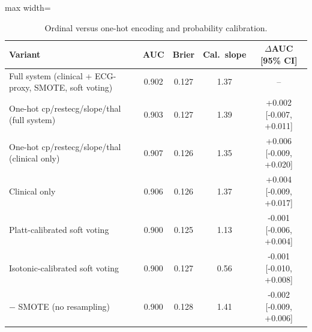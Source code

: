\begin{table}[!t]
\centering
\scriptsize
\caption{Ordinal versus one-hot encoding and probability calibration.}
\label{tab:e6}
\setlength{\tabcolsep}{3pt}
\begin{adjustbox}{max width=\linewidth}
\begin{tabular}{lcccc}
\toprule
Variant & AUC & Brier & Cal.\ slope & $\Delta$AUC [95\% CI] \\
\midrule
Full system (clinical + ECG-proxy, SMOTE, soft voting) & 0.902 & 0.127 & 1.37 & -- \\
One-hot cp/restecg/slope/thal (full system) & 0.903 & 0.127 & 1.39 & +0.002 [-0.007, +0.011] \\
One-hot cp/restecg/slope/thal (clinical only) & 0.907 & 0.126 & 1.35 & +0.006 [-0.009, +0.020] \\
Clinical only & 0.906 & 0.126 & 1.37 & +0.004 [-0.009, +0.017] \\
Platt-calibrated soft voting & 0.900 & 0.125 & 1.13 & -0.001 [-0.006, +0.004] \\
Isotonic-calibrated soft voting & 0.900 & 0.127 & 0.56 & -0.001 [-0.010, +0.008] \\
$-$ SMOTE (no resampling) & 0.900 & 0.128 & 1.41 & -0.002 [-0.009, +0.006] \\
\bottomrule
\end{tabular}
\end{adjustbox}
\end{table}
